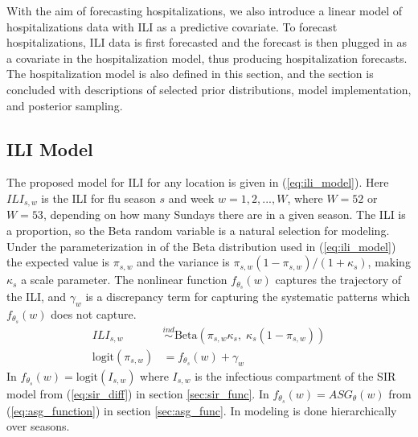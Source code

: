 \documentclass[ba]{imsart}
\theoremstyle{plain}
\theoremstyle{definition}
\theoremstyle{remark}
\begin{document}
With the aim of forecasting hospitalizations, we also introduce a linear model of hospitalizations data with ILI as a predictive covariate. To forecast hospitalizations, ILI data is first forecasted and the forecast is then plugged in as a covariate in the hospitalization model, thus producing hospitalization forecasts. The hospitalization model is also defined in this section, and the section is concluded with descriptions of selected prior distributions, model implementation, and posterior sampling.



\subsection{ILI Model} \label{sec:ili_model}

The proposed model for ILI for any location is given in (\ref{eq:ili_model}). Here $ILI_{s,w}$ is the ILI for flu season $s$ and week $w = 1, 2, ..., W$, where $W = 52$ or $W = 53$, depending on how many Sundays there are in a given season. The ILI is a proportion, so the Beta random variable is a natural selection for modeling. Under the parameterization in of the Beta distribution used in (\ref{eq:ili_model}) the expected value is $\pi_{s,w}$ and the variance is $\pi_{s,w}(1 - \pi_{s,w})/(1 + \kappa_s)$, making $\kappa_s$ a scale parameter. The nonlinear function $f_{\theta_s}(w)$ captures the trajectory of the ILI, and $\gamma_w$ is a discrepancy term for capturing the systematic patterns which $f_{\theta_s}(w)$ does not capture. 
\begin{equation}
\begin{aligned}
    \label{eq:ili_model}
        ILI_{s,w} &\overset{ind}{\sim} \text{Beta}(\pi_{s,w}\kappa_s,\; \kappa_s(1 - \pi_{s,w})) \\
        \text{logit}(\pi_{s,w}) &= f_{\theta_s}(w) + \gamma_w
\end{aligned}
\end{equation}
In \cite{osthus2019dynamic} $f_{\theta_s}(w) = \text{logit}(I_{s,w})$ where $I_{s,w}$ is the infectious compartment of the SIR model from (\ref{eq:sir_diff}) in section \ref{sec:sir_func}. In \cite{ulloa2019} $f_{\theta_s}(w) = ASG_{\theta}(w)$ from (\ref{eq:asg_function}) in section \ref{sec:asg_func}. In \cite{ulloa2019} modeling is done hierarchically over seasons. 
\end{document}
